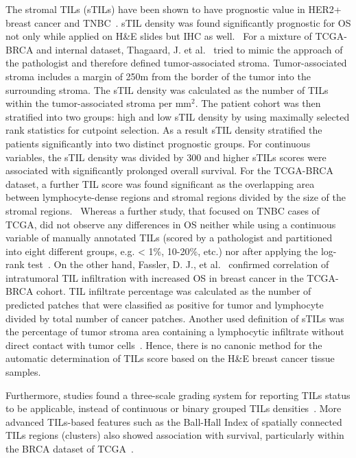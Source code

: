 The stromal TILs (sTILs) have been shown to have prognostic value in HER2+ breast cancer and TNBC~\cite{kos2020pitfalls}. 
sTIL density was found significantly prognostic for OS not only while applied on H\&E slides but IHC as well.~\cite{kapil2021breast}
For a mixture of TCGA-BRCA and internal dataset, Thagaard, J. et al.~\cite{thagaard2021automated} tried to mimic the approach of the pathologist and therefore defined tumor-associated stroma. Tumor-associated stroma includes a margin of 250\textmu m from the border of the tumor into the surrounding stroma. The sTIL density was calculated as the number of TILs within the tumor-associated stroma per mm$^2$. The patient cohort was then stratified into two groups: high and low sTIL density by using maximally selected rank statistics for cutpoint selection. As a result sTIL density stratified the patients significantly into two distinct prognostic groups.  For continuous variables, the sTIL density was divided by 300 and higher sTILs scores were associated with significantly prolonged overall survival. For the TCGA-BRCA dataset, a further TIL score was found significant as the overlapping area between lymphocyte-dense regions and stromal regions divided by the size of the stromal regions.~\cite{sun2021computational}  Whereas a further study, that focused on TNBC cases of TCGA, did not observe any differences in OS neither while using a continuous variable of manually annotated TILs (scored by a pathologist and partitioned into eight different groups, e.g. < 1\%, 10-20\%, etc.) nor after applying the log-rank test~\cite{craven2021cibersort}.
On the other hand, Fassler, D. J., et al.~\cite{fassler2022spatial} confirmed correlation of intratumoral TIL infiltration with increased OS in breast cancer in the TCGA-BRCA cohort. TIL infiltrate percentage was calculated as the number of predicted patches that were classified as positive for tumor and lymphocyte divided by total number of cancer patches.
Another used definition of sTILs was the percentage of tumor stroma area containing a lymphocytic infiltrate without direct contact with tumor cells~\cite{meng2018distribution}.
Hence, there is no canonic method for the automatic determination of TILs score based on the H\&E breast cancer tissue samples.

Furthermore, studies found a three-scale grading system for reporting TILs status to be applicable, instead of continuous or binary grouped TILs densities~\cite{kotoula2016tumors}. More advanced TILs-based features such as the Ball-Hall Index of spatially connected TILs regions (clusters) also showed association with survival, particularly within the BRCA dataset of TCGA~\cite{saltz2018spatial}. 